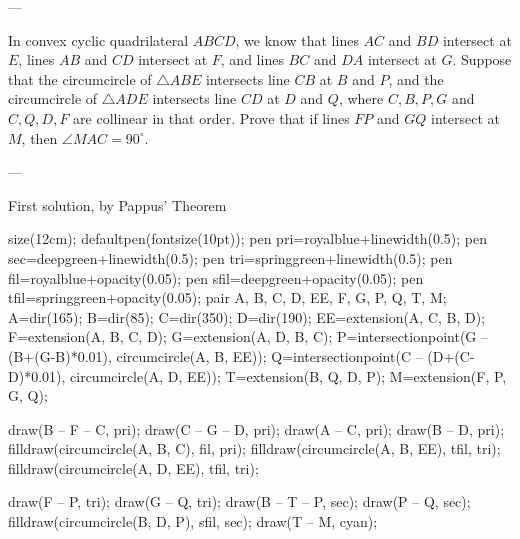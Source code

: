 
---

In convex cyclic quadrilateral $ABCD$, we know that lines $AC$ and $BD$ intersect at $E$, lines $AB$ and $CD$ intersect at $F$, and lines $BC$ and $DA$ intersect at $G$. Suppose that the circumcircle of $\triangle ABE$ intersects line $CB$ at $B$ and $P$, and the circumcircle of $\triangle ADE$ intersects line $CD$ at $D$ and $Q$, where $C,B,P,G$ and $C,Q,D,F$ are collinear in that order. Prove that if lines $FP$ and $GQ$ intersect at $M$, then $\angle MAC=90^\circ$.

---

\begin{customenv}{First solution, by Pappus' Theorem}\
    \begin{center}
        \begin{asy}
            size(12cm);
            defaultpen(fontsize(10pt));
            pen pri=royalblue+linewidth(0.5);
            pen sec=deepgreen+linewidth(0.5);
            pen tri=springgreen+linewidth(0.5);
            pen fil=royalblue+opacity(0.05);
            pen sfil=deepgreen+opacity(0.05);
            pen tfil=springgreen+opacity(0.05);
            pair A, B, C, D, EE, F, G, P, Q, T, M;
            A=dir(165);
            B=dir(85);
            C=dir(350);
            D=dir(190);
            EE=extension(A, C, B, D);
            F=extension(A, B, C, D);
            G=extension(A, D, B, C);
            P=intersectionpoint(G -- (B+(G-B)*0.01), circumcircle(A, B, EE));
            Q=intersectionpoint(C -- (D+(C-D)*0.01), circumcircle(A, D, EE));
            T=extension(B, Q, D, P);
            M=extension(F, P, G, Q);

            draw(B -- F -- C, pri); draw(C -- G -- D, pri); draw(A -- C, pri); draw(B -- D, pri); filldraw(circumcircle(A, B, C), fil, pri);
            filldraw(circumcircle(A, B, EE), tfil, tri); filldraw(circumcircle(A, D, EE), tfil, tri);

            draw(F -- P, tri); draw(G -- Q, tri);
            draw(B -- T -- P, sec); draw(P -- Q, sec); filldraw(circumcircle(B, D, P), sfil, sec);
            draw(T -- M, cyan);


\end{asy}
\end{center}
\end{customenv}
